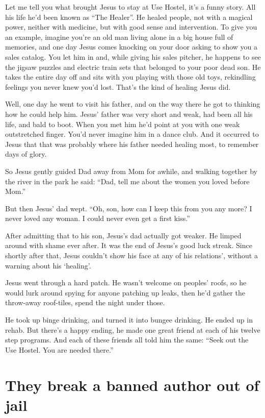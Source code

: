 \documentclass[oneside]{book}
\begin{document}
Let me tell you what brought Jesus to stay at Use Hostel, it's a funny story.
All his life he'd been known as ``The Healer''.  He healed people, not with a magical
power, neither with medicine, but with good sense and intervention.
To give you an example, imagine you're an old man living alone in a big house full
of memories, and one day Jesus comes knocking on your door asking to show you a sales
catalog.  You let him in and, while giving his sales pitcher, he happens to see the jigsaw puzzles
and electric train sets that belonged to your poor dead son.  He takes the entire day off
and sits with you playing with those old toys, rekindling feelings you never knew
you'd lost.  That's the kind of healing Jesus did.

Well, one day he went to visit his father, and on the way there he got to thinking how he
could help him.  Jesus' father was very short and weak, had been all his life, and bald
to boot.  When you met him he'd point at you with one weak outstretched finger.  You'd never
imagine him in a dance club.  And it occurred to Jesus that that was probably where his
father needed healing most, to remember days of glory.

So Jesus gently guided Dad away from Mom for awhile, and walking together by the river in the park
he said:  ``Dad, tell me about the women you loved before Mom.''

But then Jesus' dad wept.  ``Oh, son, how can I keep this from you any more?
I never loved any woman.  I could never even get a first kiss.''

After admitting that to his son, Jesus's dad actually got weaker.
He limped around with shame ever after.  It was the end of Jesus's good luck streak.
Since shortly after that, Jesus couldn't show his face at any of his
relations', without a warning about his `healing'.

Jesus went through a hard patch.  He wasn't welcome on peoples' roofs, so he
would lurk around spying for anyone patching up leaks, then he'd gather the
throw-away roof-tiles, spend the night under those.

He took up binge drinking, and turned it into bungee drinking.  He ended
up in rehab.  But there's a happy ending, he made one great friend at each
of his twelve step programs.  And each of these friends all told him the same:
``Seek out the Use Hostel.  You are needed there.''

\chapter{They break a banned author out of jail}
\end{document}
